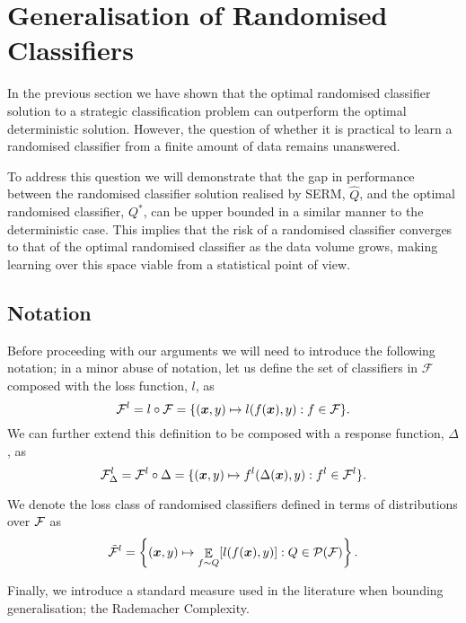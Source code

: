 \section{Generalisation of Randomised Classifiers}
In the previous section we have shown that the optimal randomised classifier solution to a strategic classification problem can outperform the optimal deterministic solution. However, the question of whether it is practical to learn a randomised classifier from a finite amount of data remains unanswered.

To address this question we will demonstrate that the gap in performance between the randomised classifier solution realised by SERM, $\hat{Q}$, and the optimal randomised classifier, $Q^{\ast}$, can be upper bounded in a similar manner to the deterministic case. This implies that the risk of a randomised classifier converges to that of the optimal randomised classifier as the data volume grows, making learning over this space viable from a statistical point of view.

\subsection{Notation}
Before proceeding with our arguments we will need to introduce the following notation; in a minor abuse of notation, let us define the set of classifiers in $\mathcal{F}$ composed with the loss function, $l$, as
\begin{equation}
    {\mathcal{F}}^l = l \circ {\mathcal{F}} = \{({\bm{x}}, y) \mapsto l(f({\bm{x}}),y): f \in {\mathcal{F}}\}.
\end{equation}
We can further extend this definition to be composed with a response function, $\Delta$, as
\begin{equation}
    {\mathcal{F}}^l_{\Delta} = {\mathcal{F}}^l \circ \Delta = \{({\bm{x}},y) \mapsto f^l(\Delta({\bm{x}}), y): f^l \in {\mathcal{F}}^l \}.
\end{equation}

We denote the loss class of randomised classifiers defined in terms of distributions over ${\mathcal{F}}$ as
\begin{equation}
    \tilde{{\mathcal{F}}}^l = \left\{ ({\bm{x}}, y) \mapsto \mathop{\mathbb{E}}_{f \sim Q}[l(f({\bm{x}}), y)] : Q \in {\mathcal{P}}({\mathcal{F}}) \right\}.
\end{equation}

Finally, we introduce a standard measure used in the literature when bounding generalisation; the Rademacher Complexity.

